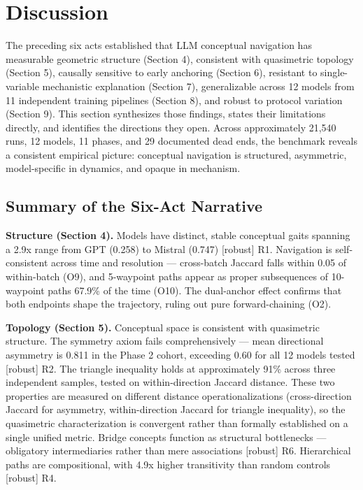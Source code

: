 \section{Discussion}\label{discussion}

The preceding six acts established that LLM conceptual navigation has measurable geometric structure (Section 4), consistent with quasimetric topology (Section 5), causally sensitive to early anchoring (Section 6), resistant to single-variable mechanistic explanation (Section 7), generalizable across 12 models from 11 independent training pipelines (Section 8), and robust to protocol variation (Section 9). This section synthesizes those findings, states their limitations directly, and identifies the directions they open. Across approximately 21,540 runs, 12 models, 11 phases, and 29 documented dead ends, the benchmark reveals a consistent empirical picture: conceptual navigation is structured, asymmetric, model-specific in dynamics, and opaque in mechanism.

\subsection{Summary of the Six-Act Narrative}\label{summary-of-the-six-act-narrative}

\textbf{Structure (Section 4).} Models have distinct, stable conceptual gaits spanning a 2.9x range from GPT (0.258) to Mistral (0.747) {[}robust{]} R1. Navigation is self-consistent across time and resolution --- cross-batch Jaccard falls within 0.05 of within-batch (O9), and 5-waypoint paths appear as proper subsequences of 10-waypoint paths 67.9\% of the time (O10). The dual-anchor effect confirms that both endpoints shape the trajectory, ruling out pure forward-chaining (O2).

\textbf{Topology (Section 5).} Conceptual space is consistent with quasimetric structure. The symmetry axiom fails comprehensively --- mean directional asymmetry is 0.811 in the Phase 2 cohort, exceeding 0.60 for all 12 models tested {[}robust{]} R2. The triangle inequality holds at approximately 91\% across three independent samples, tested on within-direction Jaccard distance. These two properties are measured on different distance operationalizations (cross-direction Jaccard for asymmetry, within-direction Jaccard for triangle inequality), so the quasimetric characterization is convergent rather than formally established on a single unified metric. Bridge concepts function as structural bottlenecks --- obligatory intermediaries rather than mere associations {[}robust{]} R6. Hierarchical paths are compositional, with 4.9x higher transitivity than random controls {[}robust{]} R4.

